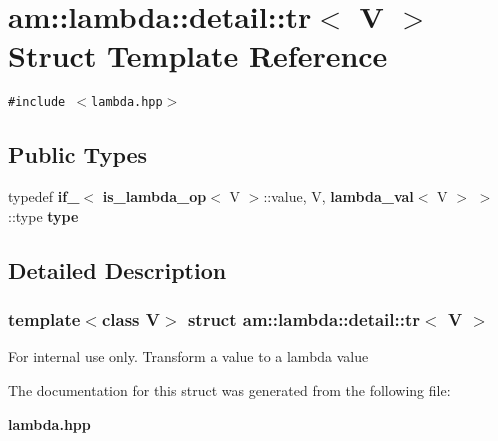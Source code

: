 \section{am::lambda::detail::tr$<$ V $>$ Struct Template Reference}
\label{structam_1_1lambda_1_1detail_1_1tr}
{\tt \#include $<$lambda.hpp$>$}

\subsection*{Public Types}
\begin{CompactItemize}
\item 
typedef {\bf if\_\-}$<$ {\bf is\_\-lambda\_\-op}$<$ V $>$::value, V, {\bf lambda\_\-val}$<$ V $>$ $>$::type \textbf{type}\label{structam_1_1lambda_1_1detail_1_1tr_acd6ff734f1b3f1c9fdb24f75c34ccf5}

\end{CompactItemize}


\subsection{Detailed Description}
\subsubsection*{template$<$class V$>$ struct am::lambda::detail::tr$<$ V $>$}

\begin{Desc}
\item[For internal use only.]
Transform a value to a lambda value \end{Desc}




The documentation for this struct was generated from the following file:\begin{CompactItemize}
\item 
{\bf lambda.hpp}\end{CompactItemize}
